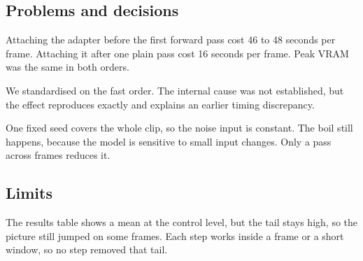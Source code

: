 
\subsection{Problems and decisions}
Attaching the adapter before the first forward pass cost 46 to 48 seconds per frame. Attaching it after one plain pass cost 16 seconds per frame. Peak VRAM was the same in both orders.

We standardised on the fast order. The internal cause was not established, but the effect reproduces exactly and explains an earlier timing discrepancy.

One fixed seed covers the whole clip, so the noise input is constant. The boil still happens, because the model is sensitive to small input changes. Only a pass across frames reduces it.

\subsection{Limits}
The results table shows a mean at the control level, but the tail stays high, so the picture still jumped on some frames. Each step works inside a frame or a short window, so no step removed that tail.
